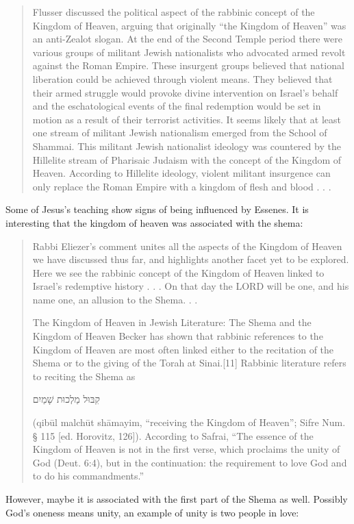 \documentclass[11pt]{article}
\begin{document}
\begin{quote}
Flusser discussed the political aspect of the rabbinic concept of the Kingdom of Heaven, arguing that originally “the Kingdom of Heaven” was an anti-Zealot slogan. At the end of the Second Temple period there were various groups of militant Jewish nationalists who advocated armed revolt against the Roman Empire. These insurgent groups believed that national liberation could be achieved through violent means. They believed that their armed struggle would provoke divine intervention on Israel’s behalf and the eschatological events of the final redemption would be set in motion as a result of their terrorist activities. It seems likely that at least one stream of militant Jewish nationalism emerged from the School of Shammai. This militant Jewish nationalist ideology was countered by the Hillelite stream of Pharisaic Judaism with the concept of the Kingdom of Heaven. According to Hillelite ideology, violent militant insurgence can only replace the Roman Empire with a kingdom of flesh and blood . . . 
\cite{kingdom of heaven jp}
\end{quote} 
Some of Jesus's teaching show signs of being influenced by Essenes. It is interesting that the kingdom of heaven was associated with the shema:
\begin{quote}
Rabbi Eliezer’s comment unites all the aspects of the Kingdom of Heaven we have discussed thus far, and highlights another facet yet to be explored. Here we see the rabbinic concept of the Kingdom of Heaven linked to Israel’s redemptive history . . . On that day the LORD will be one, and his name one, an allusion to the Shema. . .

The Kingdom of Heaven in Jewish Literature: The Shema and the Kingdom of Heaven
Becker has shown that rabbinic references to the Kingdom of Heaven are most often linked either to the recitation of the Shema or to the giving of the Torah at Sinai.[11] Rabbinic literature refers to reciting the Shema as\begin{hebrew} קִבּוּל מַלְכוּת שָׁמַיִם  \end{hebrew} (qibūl malchūt shāmayim, “receiving the Kingdom of Heaven”; Sifre Num. § 115 [ed. Horovitz, 126]). According to Safrai, “The essence of the Kingdom of Heaven is not in the first verse, which proclaims the unity of God (Deut. 6:4), but in the continuation: the requirement to love God and to do his commandments.” \cite{kingdom of heaven jp}
\end{quote} 
However, maybe it is associated with the first part of the Shema as well. Possibly God's oneness means unity, an example of unity is two people in love:
\end{document}
